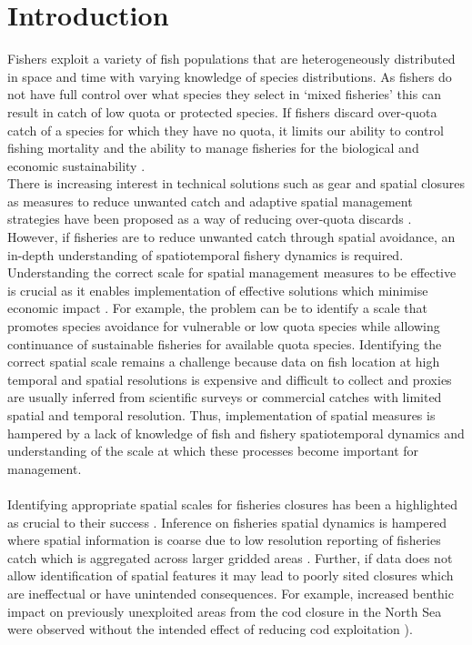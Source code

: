 \documentclass[review]{elsarticle}
\begin{document}
\linenumbers

\section{Introduction}

Fishers exploit a variety of fish populations that are heterogeneously
distributed in space and time with varying knowledge of species distributions.
As fishers do not have full control over what species they select in `mixed
fisheries' this can result in catch of low quota or protected species. If
fishers discard over-quota catch of a species for which they have no quota, it
limits our ability to control fishing mortality \citep{Alverson1994,
	Crowder1998, Rijnsdorp2007} and the ability to manage fisheries for the
biological and economic sustainability \citep{Ulrich2011a, Batsleer2015}.\\

There is increasing interest in technical solutions such as gear and spatial
closures as measures to reduce unwanted catch \citep{Kennelly2002,
	Catchpole2008, Bellido2011, Cosgrove2019} and adaptive spatial
management strategies have been proposed as a way of reducing over-quota
discards \citep{Holmes2011, Little2014, Dunn2014a}. However, if fisheries are
to reduce unwanted catch through spatial avoidance, an in-depth understanding
of spatiotemporal fishery dynamics is required. \\

Understanding the correct scale for spatial management measures to be effective
is crucial as it enables implementation of effective solutions which minimise
economic impact \citep{Dunn2016}. For example, the problem can be to identify a
scale that promotes species avoidance for vulnerable or low quota species while
allowing continuance of sustainable fisheries for available quota species.
Identifying the correct spatial scale remains a challenge because data on fish
location at high temporal and spatial resolutions is expensive and difficult to
collect and proxies are usually inferred from scientific surveys or commercial
catches with limited spatial and temporal resolution. Thus, implementation of
spatial measures is hampered by a lack of knowledge of fish and fishery
spatiotemporal dynamics and understanding of the scale at which these processes
become important for management. \\ \\ 

Identifying appropriate spatial scales for fisheries closures has been a
highlighted as crucial to their success \citep{Costello2010, Dunn2016}.
Inference on fisheries spatial dynamics is hampered where spatial information
is coarse due to low resolution reporting of fisheries catch which is
aggregated across larger gridded areas \citep{Branch2005}. Further, if data
does not allow identification of spatial features it may lead to poorly sited
closures which are ineffectual or have unintended consequences. For example,
increased benthic impact on previously unexploited areas from the cod closure
in the North Sea were observed without the intended effect of reducing cod
exploitation \citep{Rijnsdorp2001,Dinmore2003}).\\ 
\end{document}
